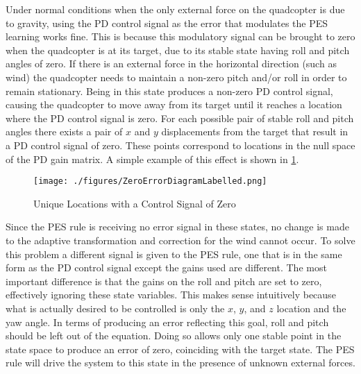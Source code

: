 \documentclass[letterpaper, 10 pt, conference]{ieeeconf}  %
\begin{document}
Under normal conditions when the only external force on the quadcopter is due to gravity, using the PD control signal as the error that modulates the PES learning works fine.
This is because this modulatory signal can be brought to zero when the quadcopter is at its target, due to its stable state having roll and pitch angles of zero.
If there is an external force in the horizontal direction (such as wind) the quadcopter needs to maintain a non-zero pitch and/or roll in order to remain stationary.
Being in this state produces a non-zero PD control signal, causing the quadcopter to move away from its target until it reaches a location where the PD control signal is zero.
For each possible pair of stable roll and pitch angles there exists a pair of $x$ and $y$ displacements from the target that result in a PD control signal of zero.
These points correspond to locations in the null space of the PD gain matrix.
A simple example of this effect is shown in \ref{fig:zeroError}.

\begin{figure}
\centering
\texttt{[image: ./figures/ZeroErrorDiagramLabelled.png]}
\caption{Unique Locations with a Control Signal of Zero}
\label{fig:zeroError}
\end{figure}

Since the PES rule is receiving no error signal in these states, no change is made to the adaptive transformation and correction for the wind cannot occur.
To solve this problem a different signal is given to the PES rule, one that is in the same form as the PD control signal except the gains used are different.
The most important difference is that the gains on the roll and pitch are set to zero, effectively ignoring these state variables.
This makes sense intuitively because what is actually desired to be controlled is only the $x$, $y$, and $z$ location and the yaw angle.
In terms of producing an error reflecting this goal, roll and pitch should be left out of the equation.
Doing so allows only one stable point in the state space to produce an error of zero, coinciding with the target state.
The PES rule will drive the system to this state in the presence of unknown external forces.
\end{document}
